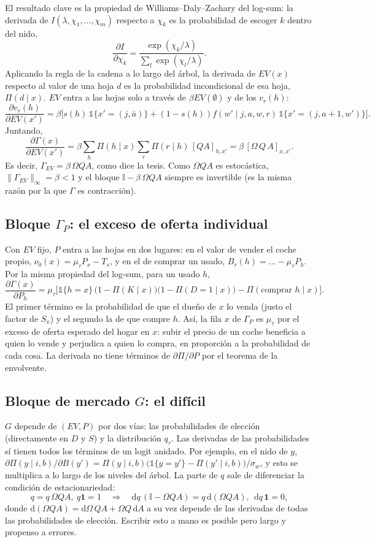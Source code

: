 \documentclass{article}
\begin{document}
El resultado clave es la propiedad de Williams--Daly--Zachary del log-sum: la derivada de
$I(\lambda,\chi_1,\dots,\chi_m)$ respecto a $\chi_k$ es la probabilidad de escoger $k$ dentro del nido,
$$\frac{\partial I}{\partial\chi_k}=\frac{\exp(\chi_k/\lambda)}{\sum_l\exp(\chi_l/\lambda)}.$$
Aplicando la regla de la cadena a lo largo del árbol, la derivada de $EV(x)$ respecto al valor de
una hoja $d$ es la probabilidad incondicional de esa hoja, $\Pi(d\mid x)$. $EV$ entra a las hojas
solo a través de $\beta EV(\emptyset)$ y de los $v_r(h)$:
$$\frac{\partial v_r(h)}{\partial EV(x')}=\beta\Big[s(h)\,\mathbb 1\{x'=(j,\bar a)\}+(1-s(h))f(w'\mid j,a,w,r)\,\mathbb 1\{x'=(j,a+1,w')\}\Big].$$
Juntando,
$$\frac{\partial\Gamma(x)}{\partial EV(x')}=\beta\sum_{h}\Pi(h\mid x)\sum_r\Pi(r\mid h)\,[QA]_{h,x'}
=\beta\,[\Omega\,Q\,A]_{x,x'}.$$
Es decir, $\Gamma_{EV}=\beta\,\Omega QA$, como dice la tesis. Como $\Omega QA$ es estocástica,
$\|\Gamma_{EV}\|_\infty=\beta<1$ y el bloque $\mathbb I-\beta\,\Omega QA$ siempre es invertible
(es la misma razón por la que $\Gamma$ es contracción).

\subsection{Bloque $\Gamma_P$: el exceso de oferta individual}

Con $EV$ fijo, $P$ entra a las hojas en dos lugares: en el valor de vender el coche propio,
$\nu_0(x)=\mu_\tau P_{x}-T_s$, y en el de comprar un usado, $B_r(h)=\dots-\mu_\tau P_h$. Por la misma
propiedad del log-sum, para un usado $h$,
$$\frac{\partial\Gamma(x)}{\partial P_h}=\mu_\tau\Big[\mathbb 1\{h=x\}\,\big(1-\Pi(K\mid x)\big)\big(1-\Pi(D=1\mid x)\big)
-\Pi(\text{comprar }h\mid x)\Big].$$
El primer término es la probabilidad de que el dueño de $x$ lo venda (justo el factor de $S_x$) y el
segundo la de que compre $h$. Así, la fila $x$ de $\Gamma_P$ es $\mu_\tau$ por el exceso de oferta
esperado del hogar en $x$: subir el precio de un coche beneficia a quien lo vende y perjudica a quien
lo compra, en proporción a la probabilidad de cada cosa. La derivada no tiene términos de
$\partial\Pi/\partial P$ por el teorema de la envolvente.

\subsection{Bloque de mercado $G$: el difícil}

$G$ depende de $(EV,P)$ por dos vías: las probabilidades de elección (directamente en $D$ y $S$) y
la distribución $q_\tau$. Las derivadas de las probabilidades sí tienen todos los términos de un
logit anidado. Por ejemplo, en el nido de $y$,
$\partial\Pi(y\mid i,b)/\partial B(y')=\Pi(y\mid i,b)\big(\mathbb 1\{y=y'\}-\Pi(y'\mid i,b)\big)/\sigma_w$,
y esto se multiplica a lo largo de los niveles del árbol. La parte de $q$ sale de diferenciar la
condición de estacionariedad:
$$q=q\,\Omega QA,\ q\mathbf 1=1\quad\Longrightarrow\quad\mathrm dq\,(\mathbb I-\Omega QA)=q\,\mathrm d(\Omega QA),\ \ \mathrm dq\,\mathbf 1=0,$$
donde $\mathrm d(\Omega QA)=\mathrm d\Omega\,QA+\Omega Q\,\mathrm dA$ a su vez depende de las derivadas de todas las probabilidades de elección.
Escribir esto a mano es posible pero largo y propenso a errores.
\end{document}

